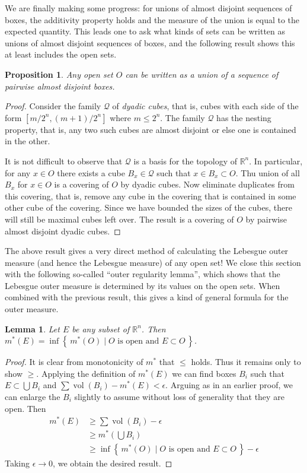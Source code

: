 \documentclass[11pt,oneside]{amsbook}
\newcommand{\set}[1]{\left\{\,#1\,\right\}}
\newcommand{\RR}{{\mathbb R}}
\DeclareMathOperator{\vol}{vol}
\theoremstyle{definition}
\theoremstyle{plain}
\newtheorem{lem}[thm]{Lemma}
\newtheorem{prop}[thm]{Proposition}
\theoremstyle{definition}
\theoremstyle{remark}
\numberwithin{equation}{section}
\numberwithin{figure}{section}
\begin{document}
We are finally making some progress: for unions of almost disjoint sequences of boxes, the additivity property holds and the measure of the union is equal to the expected quantity. This leads one to ask what kinds of sets can be written as unions of almost disjoint sequences of boxes, and the following result shows this at least includes the open sets.

\begin{prop}
  Any open set $O$ can be written as a union of a sequence of pairwise almost disjoint boxes.
\end{prop}

\begin{proof}
  Consider the family $\mathcal Q$ of \emph{dyadic cubes}, that is, cubes with each side of the form $[m/2^n,(m+1)/2^n]$ where $m\leq 2^n$. The family $\mathcal Q$ has the nesting property, that is, any two such cubes are almost disjoint or else one is contained in the other.

  It is not difficult to observe that $\mathcal Q$ is a basis for the topology of $\RR^n$. In particular, for any $x\in O$ there exists a cube $B_x\in\mathcal Q$ such that $x\in B_x\subset O$. Thu union of all $B_x$ for $x\in O$ is a covering of $O$ by dyadic cubes. Now eliminate duplicates from this covering, that is, remove any cube in the covering that is contained in some other cube of the covering. Since we have bounded the sizes of the cubes, there will still be maximal cubes left over. The result is a covering of $O$ by pairwise almost disjoint dyadic cubes.
\end{proof}

The above result gives a very direct method of calculating the Lebesgue outer measure (and hence the Lebesgue measure) of any open set! We close this section with the following so-called ``outer regularity lemma'', which shows that the Lebesgue outer measure is determined by its values on the open sets. When combined with the previous result, this gives a kind of general formula for the outer measure.

\begin{lem}
  Let $E$ be any subset of $\RR^n$. Then $m^*(E)=\inf\set{m^*(O)\mid\text{$O$ is open and }E\subset O}$.
\end{lem}

\begin{proof}
  It is clear from monotonicity of $m^*$ that $\leq$ holds. Thus it remains only to show $\geq$. Applying the definition of $m^*(E)$ we can find boxes $B_i$ such that $E\subset\bigcup B_i$ and $\sum\vol(B_i)-m^*(E)<\epsilon$. Arguing as in an earlier proof, we can enlarge the $B_i$ slightly to assume without loss of generality that they are open. Then
  \begin{align*}
    m^*(E)&\geq\sum\vol(B_i)-\epsilon\\
          &\geq m^*(\bigcup B_i)\\
          &\geq \inf\set{m^*(O)\mid\text{$O$ is open and }E\subset O}-\epsilon
  \end{align*}
  Taking $\epsilon\to0$, we obtain the desired result.
\end{proof}
\end{document}
